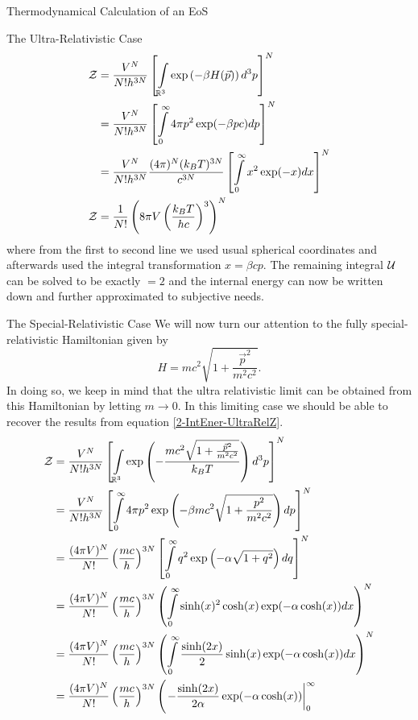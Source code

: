 \begin{section}{Thermodynamical Calculation of an EoS}
\begin{subsection}{The Ultra-Relativistic Case}
\begin{align}
	\mathcal{Z} 	&= \frac{V^N}{N!h^{3N}}\left[\int\limits_{\mathbb{R}^3}\exp\left(- \beta H(\vec{p})\right)d^3p\right]^N\\
		&= \frac{V^N}{N!h^{3N}}\left[\int\limits_0^\infty4\pi p^2\exp(-\beta pc) dp\right]^N\\
		&= \frac{V^N}{N!h^{3N}}\frac{(4\pi)^N(k_BT)^{3N}}{c^{3N}}\left[\int\limits_0^\infty x^2\exp(-x) dx\right]^N\\
	\mathcal{Z}	&= \frac{1}{N!}\left(8\pi V\left(\frac{k_BT}{hc}\right)^3\right)^N
	\label{2-IntEner-UltraRelZ}
\end{align}
where from the first to second line we used usual spherical coordinates and afterwards used the integral transformation $x=\beta cp$. 
The remaining integral $\mathcal{U}$ can be solved to be exactly $=2$ and the internal energy can now be written down and further approximated to subjective needs.
\end{subsection}
%
%
%
\begin{subsection}{The Special-Relativistic Case}
We will now turn our attention to the fully special-relativistic Hamiltonian given by
\begin{equation}
	H=mc^2\sqrt{1+\frac{\vec{p}^2}{m^2c^2}}.
\end{equation}
In doing so, we keep in mind that the ultra relativistic limit can be obtained from this Hamiltonian by letting $m\rightarrow0$. In this limiting case we should be able to recover the results from equation \eqref{2-IntEner-UltraRelZ}.
\begin{align}
	\Z 	&= \frac{V^N}{N!h^{3N}}\left[\int\limits_{\R^3}\exp\left(- \frac{mc^2\sqrt{1+\frac{\vec{p}^2}{m^2c^2}}}{k_BT}\right)d^3p\right]^N\label{2-IntEner-EQ1}\\
		&= \frac{V^N}{N!h^{3N}}\left[\int\limits_0^\infty 4\pi p^2\exp\left(-\beta mc^2\sqrt{1+\frac{p^2}{m^2c^2}} \right)dp\right]^N\\
		&= \frac{(4\pi V)^N}{N!}\left(\frac{mc}{h}\right)^{3N}\left[\int\limits_0^\infty q^2\exp\left(-\alpha\sqrt{1+q^2}\right)dq\right]^N\\
		&= \frac{(4\pi V)^N}{N!}\left(\frac{mc}{h}\right)^{3N}\left(\int\limits_0^\infty\sinh(x)^2\cosh(x)\exp(-\alpha\cosh(x))dx \right)^N\\
		&= \frac{(4\pi V)^N}{N!}\left(\frac{mc}{h}\right)^{3N}\left(\int\limits_0^\infty\frac{\sinh(2x)}{2}\sinh(x)\exp(-\alpha\cosh(x))dx \right)^N\\
		&= \frac{(4\pi V)^N}{N!}\left(\frac{mc}{h}\right)^{3N}\Biggl(\left.-\frac{\sinh(2x)}{2\alpha}\exp(-\alpha\cosh(x))\right|_0^\infty\\

\end{align}
\end{subsection}
\end{section}
